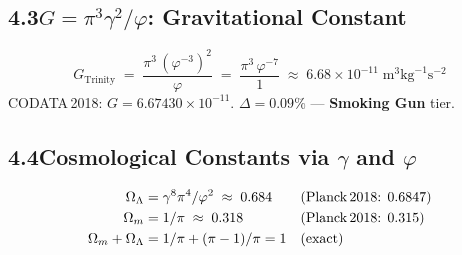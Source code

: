 \documentclass[12pt,a4paper]{article}
\newcommand{\ph}{\varphi}
\begin{document}
\subsection*{4.3\quad $G = \pi^3\gamma^2/\ph$: Gravitational Constant}

\[
  G_{\text{Trinity}} \;=\; \frac{\pi^3\,(\ph^{-3})^2}{\ph}
  \;=\; \frac{\pi^3\,\ph^{-7}}{1}
  \;\approx\; 6.68\times10^{-11}\;\text{m}^3\text{kg}^{-1}\text{s}^{-2}
\]
CODATA\,2018: $G = 6.67430\times10^{-11}$.
$\Delta = 0.09\%$ --- \textbf{Smoking Gun} tier.

\subsection*{4.4\quad Cosmological Constants via $\gamma$ and $\ph$}

\begin{align}
  \Omega_\Lambda &= \gamma^8\pi^4/\ph^2 \;\approx\; 0.684
  && \text{(Planck\,2018: }0.6847\text{)} \notag\\
  \Omega_m &= 1/\pi \;\approx\; 0.318
  && \text{(Planck\,2018: }0.315\text{)} \notag\\
  \Omega_m + \Omega_\Lambda &= 1/\pi + (\pi-1)/\pi = 1
  && \text{(exact)} \notag
\end{align}
\end{document}
